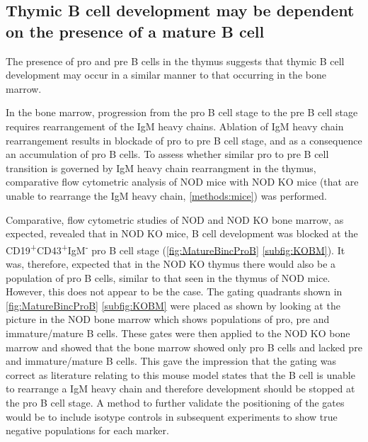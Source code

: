 \subsection{Thymic B cell development may be dependent on the presence of a mature B cell}


The presence of pro and pre B cells in the thymus suggests that thymic B cell development may occur in a similar manner to that occurring in the bone marrow.

In the bone marrow, progression from the pro B cell stage to the pre B cell stage requires rearrangement of the IgM heavy chains.
Ablation of IgM heavy chain rearrangement results in blockade of pro to pre B cell stage, and as a consequence an accumulation of pro B cells.
To assess whether similar pro to pre B cell transition is governed by IgM heavy chain rearrangment in the thymus, comparative flow cytometric analysis of NOD mice with NOD KO mice (that are unable to rearrange the IgM heavy chain, \cref{methods:mice}) was performed. 

Comparative, flow cytometric studies of NOD and NOD KO bone marrow, as expected, revealed that in NOD KO mice, B cell development was blocked at the CD19\textsuperscript{+}CD43\textsuperscript{+}IgM\textsuperscript{-} pro B cell stage (\cref{fig:MatureBincProB} \ref{subfig:KOBM}).
It was, therefore, expected that in the NOD KO thymus there would also be a population of pro B cells, similar to that seen in the thymus of NOD mice. 
However, this does not appear to be the case.
The gating quadrants shown in \cref{fig:MatureBincProB} \ref{subfig:KOBM} were placed as shown by looking at the picture in the NOD bone marrow which shows populations of pro, pre and immature/mature B cells.
These gates were then applied to the NOD KO bone marrow and showed that the bone marrow showed only pro B cells and lacked pre and immature/mature B cells.
This gave the impression that the gating was correct as literature relating to this mouse model states that the B cell is unable to rearrange a IgM heavy chain \citet{Serreze1996} and therefore development should be stopped at the pro B cell stage.
A method to further validate the positioning of the gates would be to include isotype controls in subsequent experiments to show true negative populations for each marker.

